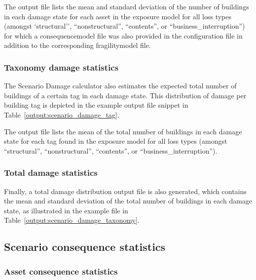 

The output file lists the mean and standard deviation of the number
of buildings in each damage state for each asset in the exposure model
for all loss types (amongst `structural'', ``nonstructural'', ``contents'', or
``business\_interruption'') for which a \gls{consequencemodel} file was also
provided in the configuration file in addition to the corresponding
\gls{fragilitymodel} file.


\subsubsection{Taxonomy damage statistics}
\label{subsubsec:scenario_taxonomy_damage_statistics}

The Scenario Damage calculator also estimates the expected total number of
buildings of a certain \gls{tag} in each damage state. This distribution
of damage per building \gls{tag} is depicted in the example
output file snippet in Table~\ref{output:scenario_damage_tag}.



The output file lists the mean of the total number
of buildings in each damage state for each tag found in the
exposure model for all loss types (amongst
``structural'', ``nonstructural'', ``contents'', or
``business\_interruption'').


\subsubsection{Total damage statistics}
\label{subsubsec:scenario_total_damage_statistics}

Finally, a total damage distribution output file is also generated, which
contains the mean and standard deviation of the total number of buildings in
each damage state, as illustrated in the example file in 
Table~\ref{output:scenario_damage_taxonomy}.




\subsection{Scenario consequence statistics}
\label{subsec:scenario_consequence_statistics}

\subsubsection{Asset consequence statistics}
\label{subsubsec:scenario_asset_consequence_statistics}

